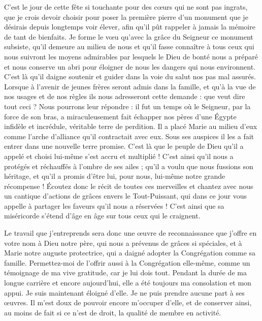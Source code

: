 C'est le jour de cette fête si touchante pour des cœurs qui ne sont pas ingrats, que je crois devoir choisir pour poser la première pierre d'un monument que je désirais depuis longtemps voir élever, afin qu'il pût rappeler à jamais la mémoire de tant de bienfaits. Je forme le vœu qu'avec la grâce du Seigneur ce monument subsiste, qu'il demeure au milieu de nous
et qu'il fasse connaître à tous ceux qui nous suivront les moyens admirables par lesquels le Dieu de bonté nous a préparé et nous conserve un abri pour éloigner de nous les dangers qui nous environnent. C'est là qu'il daigne soutenir et guider dans la voie du salut nos pas mal assurés. Lorsque à l'avenir de jeunes frères seront admis dans la famille, et qu'à la vue de nos usages et de nos règles ils nous adresseront cette demande : que veut dire tout ceci ? Nous pourrons leur répondre : il fut un temps où le Seigneur, par la force de son bras, a miraculeusement fait échapper nos pères d'une Égypte infidèle et incrédule, véritable terre de perdition. Il a placé Marie au milieu d'eux comme l'arche d'alliance qu'il contractait avec eux. Sous ses auspices il les a fait entrer dans une nouvelle terre promise. C'est là que le peuple de Dieu qu'il a appelé et choisi lui-même s'est accru et multiplié ! C'est ainsi qu'il nous a protégés et réchauffés à l'ombre de ses ailes ; qu'il a voulu que nous fussions son héritage, et qu'il a promis d'être lui, pour nous, lui-même notre grande récompense ! Écoutez donc le récit de toutes ces merveilles et chantez avec nous un cantique d'actions de grâces envers le Tout-Puissant, qui dans ce jour vous appelle à partager les faveurs qu'il nous a réservées ! C'est ainsi que sa miséricorde s'étend d'âge en âge sur tous ceux qui le craignent.

Le travail que j'entreprends sera donc une œuvre de reconnaissance que j'offre en votre nom à Dieu notre père, qui nous a prévenus de grâces si spéciales, et à Marie notre auguste protectrice, qui a daigné adopter la
Congrégation comme sa famille. Permettez-moi de l'offrir aussi à la Congrégation elle-même, comme un témoignage de ma vive gratitude, car je lui dois tout. Pendant la durée de ma longue carrière et encore aujourd'hui, elle a été toujours ma consolation et mon appui. Je suis maintenant éloigné d'elle. Je ne puis prendre aucune part à ses œuvres. Il m'est doux de pouvoir encore m'occuper d'elle, et de conserver ainsi, au moins de fait si ce n'est de droit, la qualité de membre en activité.

